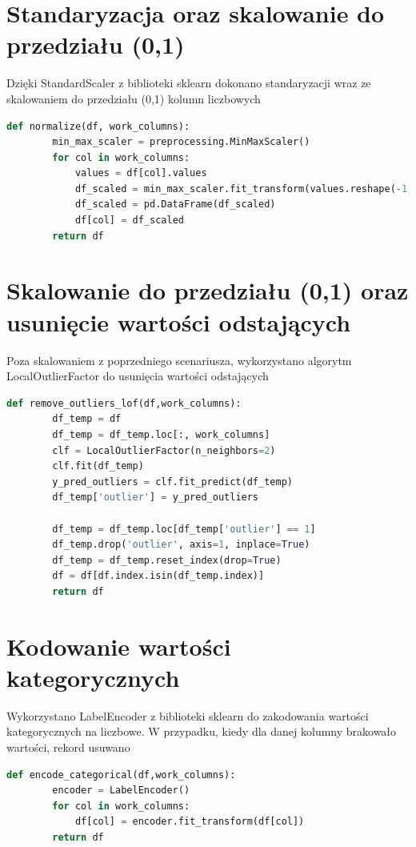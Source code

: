 \documentclass{book}
\begin{document}
\section{Standaryzacja oraz skalowanie do przedziału (0,1)}
Dzięki StandardScaler z biblioteki sklearn dokonano 
standaryzacji wraz ze skalowaniem do przedziału (0,1) 
kolumn liczbowych

\begin{lstlisting}[language=Python, caption={Skalowanie do 
    przedziału (0,1)}, captionpos=b]
    def normalize(df, work_columns):
        min_max_scaler = preprocessing.MinMaxScaler()
        for col in work_columns:
            values = df[col].values
            df_scaled = min_max_scaler.fit_transform(values.reshape(-1, 1)) 
            df_scaled = pd.DataFrame(df_scaled)
            df[col] = df_scaled
        return df
\end{lstlisting}

\section{Skalowanie do przedziału (0,1) oraz usunięcie 
wartości odstających}
Poza skalowaniem z poprzedniego scenariusza, 
wykorzystano algorytm LocalOutlierFactor do usunięcia 
wartości odstających

\begin{lstlisting}[language=Python, caption={Usuwanie wartości 
    odstających}, captionpos=b]
    def remove_outliers_lof(df,work_columns):
        df_temp = df
        df_temp = df_temp.loc[:, work_columns]
        clf = LocalOutlierFactor(n_neighbors=2)
        clf.fit(df_temp)
        y_pred_outliers = clf.fit_predict(df_temp)
        df_temp['outlier'] = y_pred_outliers

        df_temp = df_temp.loc[df_temp['outlier'] == 1]
        df_temp.drop('outlier', axis=1, inplace=True)
        df_temp = df_temp.reset_index(drop=True)
        df = df[df.index.isin(df_temp.index)]
        return df
\end{lstlisting}

\section{Kodowanie wartości kategorycznych}
Wykorzystano LabelEncoder z biblioteki sklearn do 
zakodowania wartości kategorycznych na liczbowe. 
W przypadku, kiedy dla danej kolumny brakowało wartości, 
rekord usuwano

\begin{lstlisting}[language=Python, caption={Usuwanie wartości 
    odstających}, captionpos=b]
    def encode_categorical(df,work_columns):
        encoder = LabelEncoder()
        for col in work_columns:
            df[col] = encoder.fit_transform(df[col])
        return df
\end{lstlisting}
\end{document}
